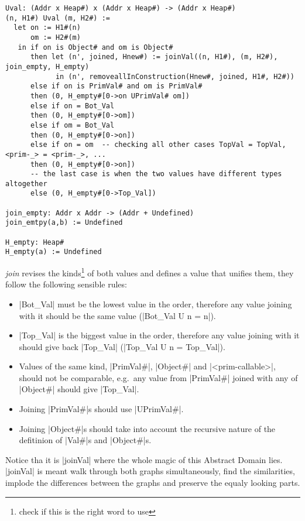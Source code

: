 \begin{verbatim}
Uval: (Addr x Heap#) x (Addr x Heap#) -> (Addr x Heap#)
(n, H1#) Uval (m, H2#) :=
  let on := H1#(n)
      om := H2#(m)
   in if on is Object# and om is Object#
      then let (n', joined, Hnew#) := joinVal((n, H1#), (m, H2#), join_empty, H_empty)
            in (n', removeallInConstruction(Hnew#, joined, H1#, H2#))
      else if on is PrimVal# and om is PrimVal#
      then (0, H_empty#[0->on UPrimVal# om])
      else if on = Bot_Val
      then (0, H_empty#[0->om])
      else if om = Bot_Val
      then (0, H_empty#[0->on])
      else if on = om  -- checking all other cases TopVal = TopVal, <prim-_> = <prim-_>, ...
      then (0, H_empty#[0->on])
      -- the last case is when the two values have different types altogether
      else (0, H_empty#[0->Top_Val])

join_empty: Addr x Addr -> (Addr + Undefined)
join_emtpy(a,b) := Undefined

H_empty: Heap#
H_empty(a) := Undefined
\end{verbatim}

\emph{join} revises the kinds\footnote{check if this is the right word
  to use} of both values and defines a value that unifies them, they
follow the following sensible rules:

\begin{itemize}
\tightlist
\item
  \pycode|Bot_Val| must be the lowest value in the order, therefore any
  value joining with it should be the same value
  (\pycode|Bot_Val U n = n|).
\item
  \pycode|Top_Val| is the biggest value in the order, therefore any
  value joining with it should give back \pycode|Top_Val|
  (\pycode|Top_Val U n = Top_Val|).
\item
  Values of the same kind, \pycode|PrimVal#|, \pycode|Object#| and
  \pycode|<prim-callable>|, should not be
  comparable, e.g.~any value from \pycode|PrimVal#| joined with any of
  \pycode|Object#| should give \pycode|Top_Val|.
\item
  Joining \pycode|PrimVal#|s should use \pycode|UPrimVal#|.
\item
  Joining \pycode|Object#|s should take into account the recursive
  nature of the defitinion of \pycode|Val#|s and \pycode|Object#|s.
\end{itemize}

Notice tha it is \pycode|joinVal| where the whole magic of this Abstract
Domain lies. \pycode|joinVal| is meant walk through both graphs
simultaneously, find the similarities, implode the differences between
the graphs and preserve the equaly looking parts.

